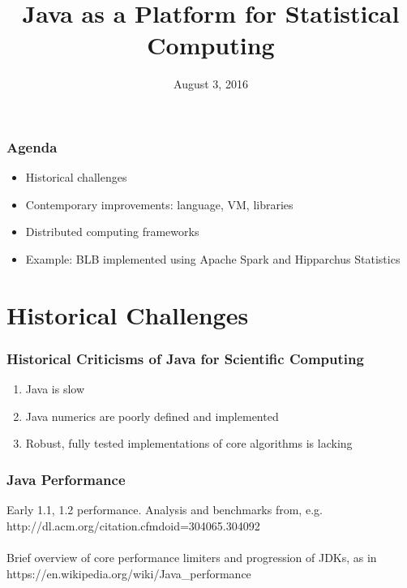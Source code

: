 \documentclass[14pt,mathserif]{beamer}
\title{Java as a Platform for Statistical Computing}
\author{
  \newauthor{Phil Steitz}{phil@steitz.com}
}
\institute[Joint Statistical Meetings]{Joint Statistical Meetings 2016}
\date{August 3, 2016}
\begin{document}
{
\begin{frame} %
  \titlepage
\end{frame}
}

\begin{frame}
  \frametitle{Agenda}
\begin{itemize}
  \item Historical challenges
  \item Contemporary improvements: language, VM, libraries
  \item Distributed computing frameworks
  \item Example: BLB implemented using Apache Spark and Hipparchus Statistics
\end{itemize}

\end{frame}

\section[History]{Historical Challenges}

\begin{frame}
  \frametitle{Historical Criticisms of Java for Scientific Computing}

\begin{enumerate}
  \item Java is slow
  \item Java numerics are poorly defined and implemented
  \item Robust, fully tested implementations of core algorithms is lacking
\end{enumerate}

\end{frame}

\begin{frame}
  \frametitle{Java Performance}
Early 1.1, 1.2 performance. Analysis and benchmarks from, e.g. http://dl.acm.org/citation.cfmdoid=304065.304092
\\
\\
Brief overview of core performance limiters and progression of JDKs, as in
https://en.wikipedia.org/wiki/Java\_performance
\end{frame}
\end{document}
